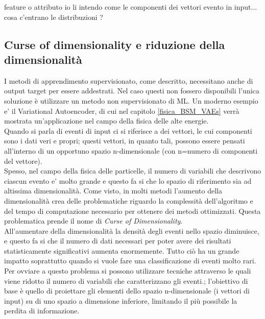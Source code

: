 \color{red}
feature o attributo io li intendo come le componenti dei vettori evento in input... cosa c'entrano le distribuzioni ?
\color{black}

\newpage


\subsection{Curse of dimensionality e riduzione della dimensionalità}
\label{curse_dim}

I metodi di apprendimento supervisionato, come descritto, necessitano anche di output target per essere addestrati. Nel caso questi non fossero disponibili l'unica soluzione è utilizzare un metodo non supervisionato di ML. Un moderno esempio e' il Variational Autoencoder, di cui nel capitolo \ref{fisica_BSM_VAEs} verrà mostrata un'applicazione nel campo della fisica delle alte energie. \\
Quando si parla di eventi di input ci si riferisce a dei vettori, le cui componenti sono i dati veri e propri; questi vettori, in quanto tali, possono essere pensati all'interno di un opportuno spazio n-dimensionale (con n=numero di componenti del vettore).\\
Spesso, nel campo della fisica delle particelle, il numero di variabili che descrivono ciascun evento e' molto grande e  questo fa si che lo spazio di riferimento sia ad altissima dimensionalità. Come visto, in molti metodi l'aumento della dimensionalità crea delle problematiche riguardo la complessità dell'algoritmo e del tempo di computazione necessario per ottenere dei metodi ottimizzati. Questa problematica prende il nome di \textit{Curse of Dimensionality}. \\
All'aumentare della dimensionalità la densità degli eventi nello spazio diminuisce, e questo fa si che il numero di dati necessari per poter avere dei risultati statisticamente significativi aumenta enormemente. Tutto ciò ha un grande impatto soprattutto quando si vuole fare una classificazione di eventi molto rari.\\
Per ovviare a questo problema si possono utilizzare tecniche attraverso le quali viene ridotto il numero di variabili che caratterizzano gli eventi.; l'obiettivo di base è quello di proiettare gli elementi dello spazio n-dimensionale (i vettori di input) su di uno spazio a dimensione inferiore, limitando il più possibile la perdita di informazione.\\
